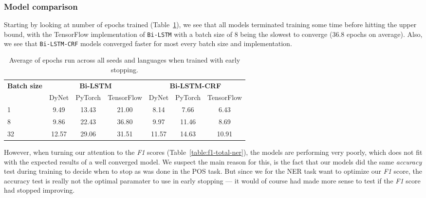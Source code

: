 \subsubsection{Model comparison}

Starting by looking at number of epochs trained
(Table~\ref{table:epochs-run-ner}), we see that all models terminated training
some time before hitting the upper bound, with the TensorFlow implementation of
\texttt{Bi-LSTM} with a batch size of 8 being the slowest to converge (36.8
epochs on average). Also, we see that \texttt{Bi-LSTM-CRF} models converged
faster for most every batch size and implementation.

\begin{table}[h!]
    \centering
    \begin{tabular}{l c c c|c c c}
        \toprule
        \multirow{2}{*}{\bfseries Batch size}     &
        \multicolumn{3}{c}{\bfseries Bi-LSTM}     &
        \multicolumn{3}{c}{\bfseries Bi-LSTM-CRF} \\
        \cmidrule(lr){2-7}
        & DyNet & PyTorch & TensorFlow
        & DyNet & PyTorch & TensorFlow \\
        \cmidrule(lr){1-7}
         1 &  9.49 & 13.43 & 21.00 &  8.14 &  7.66 &  6.43 \\
         8 &  9.86 & 22.43 & 36.80 &  9.97 & 11.46 &  8.69 \\
        32 & 12.57 & 29.06 & 31.51 & 11.57 & 14.63 & 10.91 \\
        \bottomrule
    \end{tabular}
    \caption{Average of epochs run across all seeds and languages when trained
        with early stopping.
        }\label{table:epochs-run-ner}
\end{table}

However, when turning our attention to the \textit{F1} scores
(Table~\ref{table:f1-total-ner}), the models are performing very poorly, which
does not fit with the expected results of a well converged model. We suspect the
main reason for this, is the fact that our models did the same \textit{accuracy}
test during training to decide when to stop as was done in the POS task. But
since we for the NER task want to optimize our \textit{F1} score, the accuracy
test is really not the optimal paramater to use in early stopping --- it would
of course had made more sense to test if the \textit{F1} score had stopped
improving.


